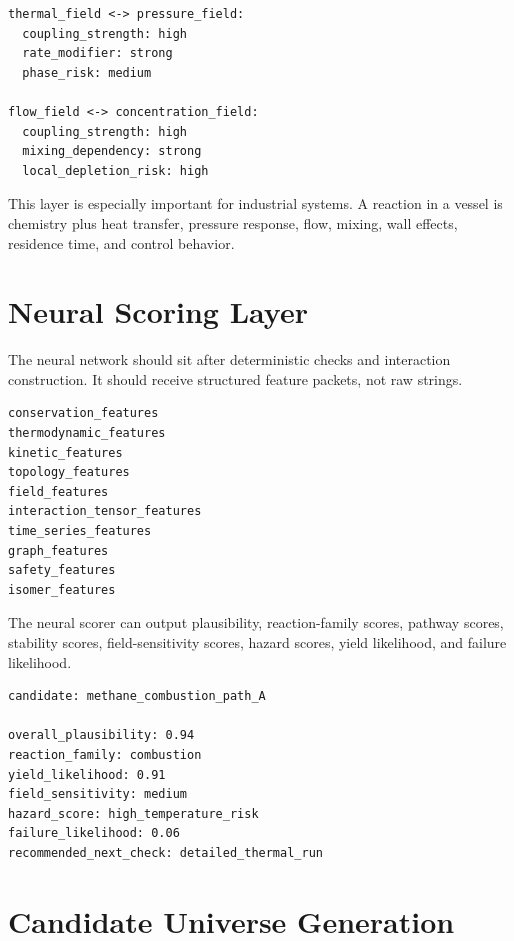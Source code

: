 \documentclass[11pt]{article}
\begin{document}
\begin{lstlisting}[caption={Field-field examples}]
thermal_field <-> pressure_field:
  coupling_strength: high
  rate_modifier: strong
  phase_risk: medium

flow_field <-> concentration_field:
  coupling_strength: high
  mixing_dependency: strong
  local_depletion_risk: high
\end{lstlisting}

This layer is especially important for industrial systems. A reaction in a vessel is chemistry plus heat transfer, pressure response, flow, mixing, wall effects, residence time, and control behavior.

\section{Neural Scoring Layer}

The neural network should sit after deterministic checks and interaction construction. It should receive structured feature packets, not raw strings.

\begin{lstlisting}[caption={Model-ready feature packet}]
conservation_features
thermodynamic_features
kinetic_features
topology_features
field_features
interaction_tensor_features
time_series_features
graph_features
safety_features
isomer_features
\end{lstlisting}

The neural scorer can output plausibility, reaction-family scores, pathway scores, stability scores, field-sensitivity scores, hazard scores, yield likelihood, and failure likelihood.

\begin{lstlisting}[caption={Example neural scoring output}]
candidate: methane_combustion_path_A

overall_plausibility: 0.94
reaction_family: combustion
yield_likelihood: 0.91
field_sensitivity: medium
hazard_score: high_temperature_risk
failure_likelihood: 0.06
recommended_next_check: detailed_thermal_run
\end{lstlisting}

\section{Candidate Universe Generation}
\end{document}
